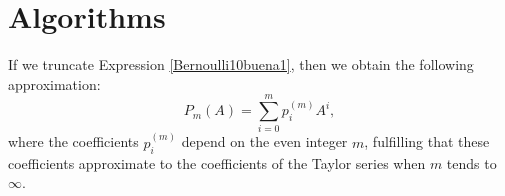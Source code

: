 \section{Algorithms} \label{section2}
If we truncate Expression \ref{Bernoulli10buena1}, then we obtain the following approximation:
$${P_m}(A) = \sum\limits_{i = 0}^m {{p_i^{(m)}}{A^i}},$$
where the coefficients ${p_i^{(m)}}$ depend on  
 the even integer $m$, fulfilling that these coefficients  approximate to the coefficients of the Taylor series when $m$ tends to $\infty$.   
